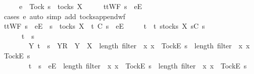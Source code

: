 \begin{isabellebody}
%
\isadelimproof
%
\endisadelimproof
%
\isatagproof
{}\isamarkupfalse%
\ {\isacharminus}\isanewline
\ \ \isamarkupfalse%
\ {\isachardoublequoteopen}e\ {\isasymnoteq}\ Tock{\isachardoublequoteclose}\ {\isachardoublequoteopen}s\ {\isasymin}\ tocks\ X{\isachardoublequoteclose}\isanewline
\ \ \isamarkupfalse%
\ \isamarkupfalse%
\ {\isachardoublequoteopen}ttWF\ {\isacharparenleft}s\ {\isacharat}\ {\isacharbrackleft}{\isacharbrackleft}e{\isacharbrackright}\isactrlsub E{\isacharbrackright}{\isacharparenright}{\isachardoublequoteclose}\isanewline
\ \ \ \ \isamarkupfalse%
\ {\isacharparenleft}cases\ e{\isacharcomma}\ auto\ simp\ add{\isacharcolon}\ tocks{\isacharunderscore}append{\isacharunderscore}wf{\isacharparenright}\isanewline
\ \ \isamarkupfalse%
\ \isamarkupfalse%
\ {\isachardoublequoteopen}ttWF\ {\isacharparenleft}s\ {\isacharat}\ {\isacharbrackleft}{\isacharbrackleft}e{\isacharbrackright}\isactrlsub E{\isacharbrackright}{\isacharparenright}\ {\isasymlongrightarrow}\ s\ {\isasymin}\ tocks\ X\ {\isasymlongrightarrow}\ t\ {\isasymlesssim}\isactrlsub C\ s\ {\isacharat}\ {\isacharbrackleft}{\isacharbrackleft}e{\isacharbrackright}\isactrlsub E{\isacharbrackright}\ {\isasymlongrightarrow}\isanewline
\ \ \ \ t\ {\isasymin}\ {\isacharbraceleft}t{\isachardot}\ {\isasymexists}s{\isacharprime}{\isasymin}tocks\ X{\isachardot}\ s{\isacharprime}{\isasymlesssim}\isactrlsub C\ s\ {\isasymand}\ \isanewline
\ \ \ \ \ \ {\isacharparenleft}t\ {\isacharequal}\ s{\isacharprime}\ {\isasymor}\ \isanewline
\ \ \ \ \ \ \ \ {\isacharparenleft}{\isasymexists}Y{\isachardot}\ t\ {\isacharequal}\ s{\isacharprime}\ {\isacharat}\ {\isacharbrackleft}{\isacharbrackleft}Y{\isacharbrackright}\isactrlsub R{\isacharbrackright}\ {\isasymand}\ Y\ {\isasymsubseteq}\ X\ {\isasymand}\ length\ {\isacharparenleft}filter\ {\isacharparenleft}{\isasymlambda}\ x{\isachardot}\ x\ {\isacharequal}\ {\isacharbrackleft}Tock{\isacharbrackright}\isactrlsub E{\isacharparenright}\ s{\isacharprime}{\isacharparenright}\ {\isacharless}\ length\ {\isacharparenleft}filter\ {\isacharparenleft}{\isasymlambda}\ x{\isachardot}\ x\ {\isacharequal}\ {\isacharbrackleft}Tock{\isacharbrackright}\isactrlsub E{\isacharparenright}\ s{\isacharparenright}{\isacharparenright}\ {\isasymor}\isanewline
\ \ \ \ \ \ \ \ {\isacharparenleft}t\ {\isacharequal}\ s{\isacharprime}\ {\isacharat}\ {\isacharbrackleft}{\isacharbrackleft}e{\isacharbrackright}\isactrlsub E{\isacharbrackright}\ {\isasymand}\ length\ {\isacharparenleft}filter\ {\isacharparenleft}{\isasymlambda}\ x{\isachardot}\ x\ {\isacharequal}\ {\isacharbrackleft}Tock{\isacharbrackright}\isactrlsub E{\isacharparenright}\ s{\isacharprime}{\isacharparenright}\ {\isacharequal}\ length\ {\isacharparenleft}filter\ {\isacharparenleft}{\isasymlambda}\ x{\isachardot}\ x\ {\isacharequal}\ {\isacharbrackleft}Tock{\isacharbrackright}\isactrlsub E{\isacharparenright}\ s{\isacharparenright}{\isacharparenright}{\isacharparenright}{\isacharbraceright}{\isachardoublequoteclose}\isanewline

\end{isabellebody}
